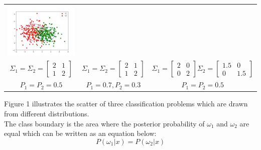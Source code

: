 \documentclass{article}
\begin{document}
\begin{center}
\begin{tabular}{ccc}
\includegraphics[scale=0.25]{w_scatter} \\
\scriptsize $\Sigma_{1} = \Sigma_{2} = \begin{bmatrix}2 & 1 \\ 1 & 2 \end{bmatrix}$ & 
\scriptsize $\Sigma_{1} = \Sigma_{2} = \begin{bmatrix}2 & 1 \\ 1 & 2 \end{bmatrix}$ &
\scriptsize $\Sigma_{1} = \begin{bmatrix}2 & 0 \\ 0 & 2 \end{bmatrix} \Sigma_{2} = \begin{bmatrix}1.5 & 0 \\ 0 & 1.5 \end{bmatrix}$\\
\scriptsize $P_{1} = P_{2} = 0.5$ & 
\scriptsize $P_{1} = 0.7, P_{2} = 0.3 $ &
\scriptsize $P_{1} = P_{2} = 0.5$\\
\end{tabular}
\end{center}

Figure 1 illustrates the scatter of three classification problems which are drawn from different distributions.\\
\indent The class boundary is the area where the posterior probability of $\omega_{1}$ and $\omega_{2}$ are equal which can be written as an equation below:
\begin{equation} \label{eq:1}
P(\omega_{1} | x) = P (\omega_{2} | x)
\end{equation}
\end{document}
